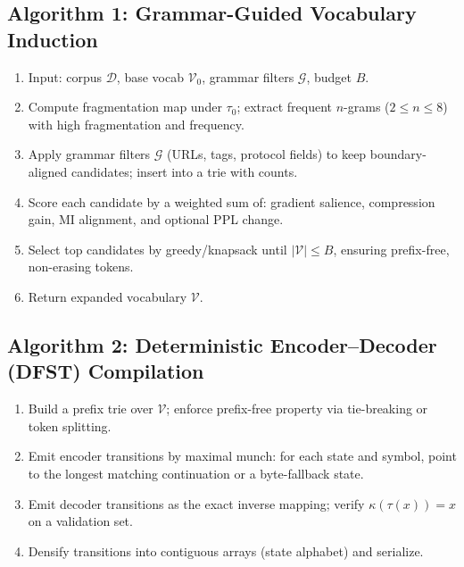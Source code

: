 
\subsection*{Algorithm 1: Grammar-Guided Vocabulary Induction}
\begin{enumerate}
  \item Input: corpus $\mathcal{D}$, base vocab $\mathcal{V}_0$, grammar filters $\mathcal{G}$, budget $B$.
  \item Compute fragmentation map under $\tau_0$; extract frequent $n$-grams ($2\!\le\!n\!\le\!8$) with high fragmentation and frequency.
  \item Apply grammar filters $\mathcal{G}$ (URLs, tags, protocol fields) to keep boundary-aligned candidates; insert into a trie with counts.
  \item Score each candidate by a weighted sum of: gradient salience, compression gain, MI alignment, and optional PPL change.
  \item Select top candidates by greedy/knapsack until $|\mathcal{V}|\le B$, ensuring prefix-free, non-erasing tokens.
  \item Return expanded vocabulary $\mathcal{V}$.
\end{enumerate}

\subsection*{Algorithm 2: Deterministic Encoder–Decoder (DFST) Compilation}
\begin{enumerate}
  \item Build a prefix trie over $\mathcal{V}$; enforce prefix-free property via tie-breaking or token splitting.
  \item Emit encoder transitions by maximal munch: for each state and symbol, point to the longest matching continuation or a byte-fallback state.
  \item Emit decoder transitions as the exact inverse mapping; verify $\kappa(\tau(x))\!=\!x$ on a validation set.
  \item Densify transitions into contiguous arrays (state\,\times\,alphabet) and serialize.
\end{enumerate}

